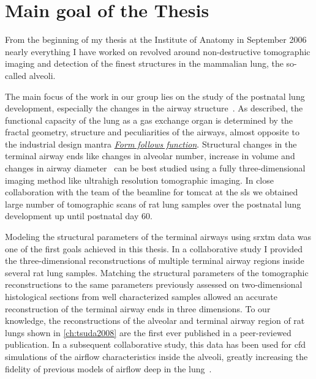 \section{Main goal of the Thesis}
From the beginning of my thesis at the Institute of Anatomy in September 2006 nearly everything I have worked on revolved around non-destructive tomographic imaging and detection of the finest structures in the mammalian lung, the so-called alveoli. 

The main focus of the work in our group lies on the study of the postnatal lung development, especially the changes in the airway structure~\cite{Burri1974}. As \citet{Weibel2009} described, the functional capacity of the lung as a gas exchange organ is determined by the fractal geometry, structure and peculiarities of the airways, almost opposite to the industrial design mantra \emph{\href{http://en.wikipedia.org/w/index.php?title=Form_follows_function&oldid=359712140}{Form follows function}}. Structural changes in the terminal airway ends like changes in alveolar number, increase in volume and changes in airway diameter~\cite{Burri1974} can be best studied using a fully three-dimensional imaging method like ultrahigh resolution tomographic imaging. In close collaboration with the team of the beamline for \ac{tomcat} at the \ac{sls} we obtained large number of tomographic scans of rat lung samples over the postnatal lung development up until postnatal day 60.

Modeling the structural parameters of the terminal airways using \ac{srxtm} data was one of the first goals achieved in this thesis. In a collaborative study I provided the three-dimensional reconstructions of multiple terminal airway regions inside several rat lung samples. Matching the structural parameters of the tomographic reconstructions to the same parameters previously assessed on two-dimensional histological sections from well characterized samples allowed an accurate reconstruction of the terminal airway ends in three dimensions. To our knowledge, the reconstructions of the alveolar and terminal airway region of rat lungs shown in \autoref{ch:tsuda2008} are the first ever published in a peer-reviewed publication. In a subsequent collaborative study, this data has been used for \ac{cfd} simulations of the airflow characteristics inside the alveoli, greatly increasing the fidelity of previous models of airflow deep in the lung~\cite{Tsuda2002}.

